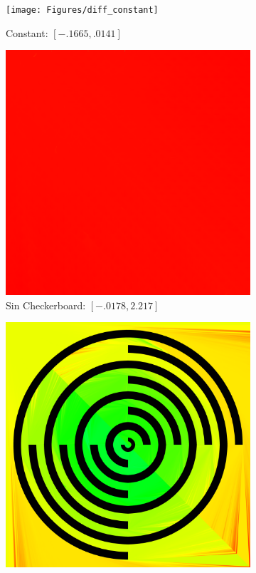 \documentclass[11pt]{article}       %
\begin{document}
\begin{figure}%
	\centering
	\begin{subfigure}[b]{.4\columnwidth}
		\texttt{[image: Figures/diff\_constant]}
		\caption{Constant: $[-.1665, .0141]$}
	\end{subfigure}
	\begin{subfigure}[b]{.4\columnwidth}
		\includegraphics[width=\textwidth]{Figures/diff_sin_checkerboard}
		\caption{Sin Checkerboard: $[-.0178, 2.217]$}
	\end{subfigure}
	\begin{subfigure}[b]{.4\columnwidth}
		\includegraphics[width=\textwidth]{Figures/diff_7_rings}

\end{subfigure}
\end{figure}
\end{document}
